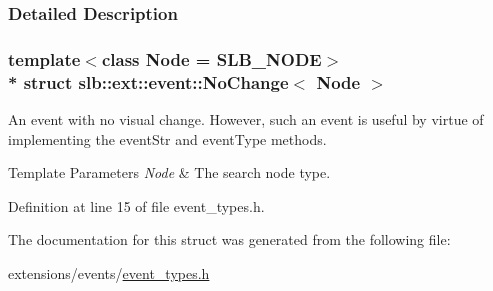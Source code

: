 \subsubsection{Detailed Description}
\subsubsection*{template$<$class Node = S\+L\+B\+\_\+\+N\+O\+DE$>$\\*
struct slb\+::ext\+::event\+::\+No\+Change$<$ Node $>$}

An event with no visual change. However, such an event is useful by virtue of implementing the {\ttfamily event\+Str} and {\ttfamily event\+Type} methods. 


\begin{DoxyTemplParams}{Template Parameters}
{\em Node} & The search node type. \\
\hline
\end{DoxyTemplParams}


Definition at line 15 of file event\+\_\+types.\+h.



The documentation for this struct was generated from the following file\+:\begin{DoxyCompactItemize}
\item 
extensions/events/\hyperlink{event__types_8h}{event\+\_\+types.\+h}\end{DoxyCompactItemize}
